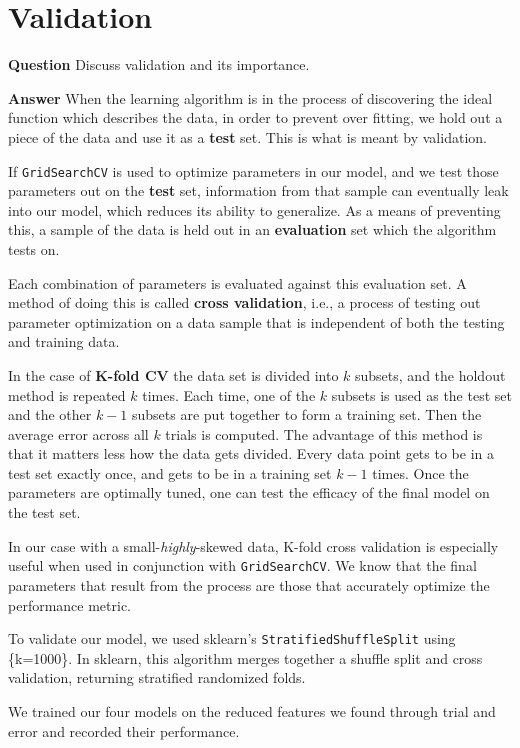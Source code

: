 \documentclass[twoside,openright,titlepage,numbers=noenddot,headinclude,%
               footinclude=true,cleardoublepage=empty,abstractoff,BCOR=5mm,%
               paper=a4,fontsize=11pt,ngerman,american]{scrreprt}
\numberwithin{theorem}{chapter}
\numberwithin{definition}{chapter}
\numberwithin{algorithm}{chapter}
\numberwithin{figure}{chapter}
\numberwithin{table}{chapter}
\numberwithin{equation}{chapter}
\begin{document}
\section*{Validation}

\textbf{Question} Discuss validation and its importance.

\textbf{Answer} When the learning algorithm is in the process of discovering the ideal function which describes the data, in order to prevent over fitting, we hold out a piece of the data and use it as a \textbf{test} set. This is what is meant by validation. 

If \texttt{GridSearchCV} is used to optimize parameters in our model, and we test those parameters out on the \textbf{test} set, information from that sample can eventually leak into our model, which reduces its ability to generalize. As a means of preventing this, a sample of the data is held out in an \textbf{evaluation} set which the algorithm tests on. 

Each combination of parameters is evaluated against this evaluation set. A method of doing this is called \textbf{cross validation}, i.e., a process of testing out parameter optimization on a data sample that is independent of both the testing and training data.

In the case of \textbf{K-fold CV} the data set is divided into $k$ subsets, and the holdout method is repeated $k$ times. Each time, one of the $k$ subsets is used as the test set and the other $k-1$ subsets are put together to form a training set. Then the average error across all $k$ trials is computed. The advantage of this method is that it matters less how the data gets divided. Every data point gets to be in a test set exactly once, and gets to be in a training set $k-1$ times. Once the parameters are optimally tuned, one can test the efficacy of the final model on the test set. 

In our case with a small-\emph{highly}-skewed data, K-fold cross validation is especially useful when used in conjunction with \texttt{GridSearchCV}. We know that the final parameters that result from the process are those that accurately optimize the performance metric. 

To validate our model, we used sklearn's \texttt{StratifiedShuffleSplit} using \{k=1000\}. In sklearn, this algorithm merges together a shuffle split and cross validation, returning stratified randomized folds.

We trained our four models on the reduced features we found through trial and error and recorded their performance. 
\end{document}
